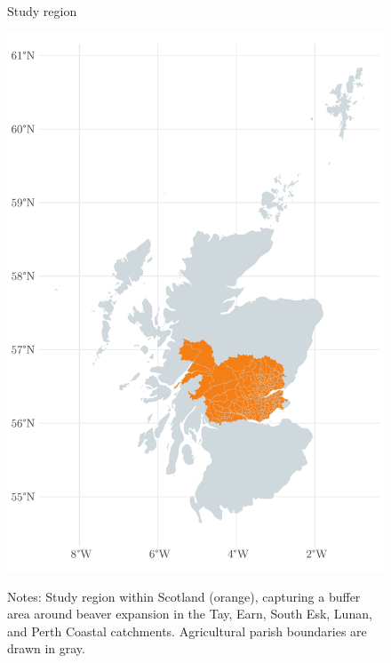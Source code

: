 \begin{figure}
    \centering
    \caption{Study region}
    \includegraphics[width=0.4\linewidth]{output/figures/study_area.pdf}
    \label{fig:study-area}
    \caption*{\justifying \footnotesize Notes: Study region within Scotland (orange), capturing a buffer area around beaver expansion in the Tay, Earn, South Esk, Lunan, and Perth Coastal catchments. Agricultural parish boundaries are drawn in gray.}
\end{figure}
